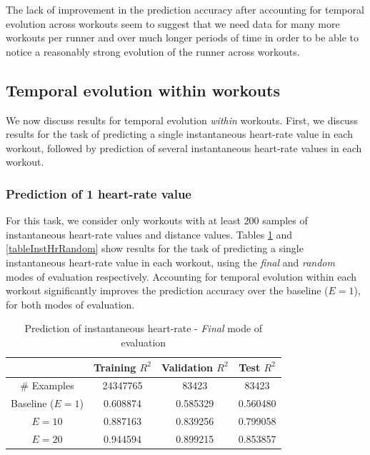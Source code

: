 \documentclass{acm_proc_article-sp}
\begin{document}
The lack of improvement in the prediction accuracy after accounting for temporal evolution across workouts seem to suggest that we need data for many more workouts per runner and over much longer periods of time in order to be able to notice a reasonably strong evolution of the runner across workouts.

\subsection{Temporal evolution within workouts}

We now discuss results for temporal evolution \emph{within} workouts. First, we discuss results for the task of predicting a single instantaneous heart-rate value in each workout, followed by prediction of several instantaneous heart-rate values in each workout.

\subsubsection{Prediction of 1 heart-rate value}

For this task, we consider only workouts with at least 200 samples of instantaneous heart-rate values and distance values. Tables \ref{tableInstHrFinal} and \ref{tableInstHrRandom} show results for the task of predicting a single instantaneous heart-rate value in each workout, using the \emph{final} and \emph{random} modes of evaluation respectively. Accounting for temporal evolution within each workout significantly improves the prediction accuracy over the baseline ($E = 1$), for both modes of evaluation.

\begin{table}[H]
\centering
\begin{tabular}{|c|c|c|c|} \hline
& Training $R^2$ & Validation $R^2$ & Test $R^2$ \\ \hline
\# Examples & 24347765 & 83423  & 83423  \\ \hline
Baseline ($E = 1$) & 0.608874 & 0.585329 & 0.560480 \\ \hline
$E = 10$ & 0.887163 & 0.839256 & 0.799058 \\ \hline
$E = 20$ & 0.944594 & 0.899215 & 0.853857  \\ \hline
\end{tabular}
\caption{Prediction of instantaneous heart-rate - \emph{Final} mode of evaluation }
\label{tableInstHrFinal}
\end{table}
\end{document}
